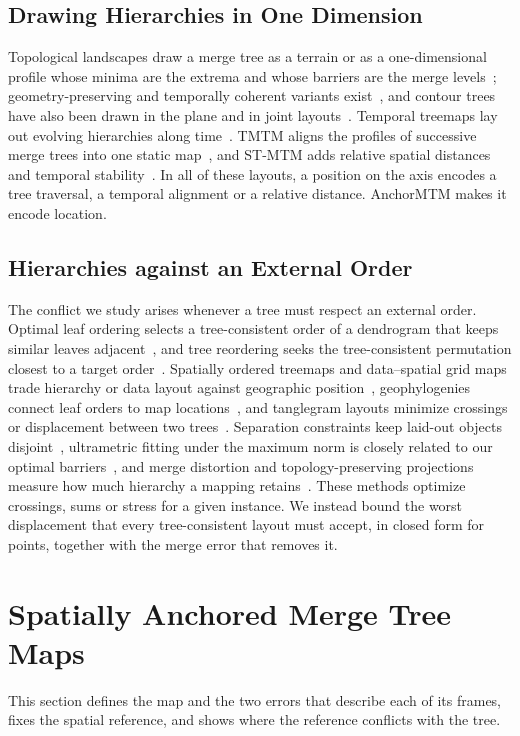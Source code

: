 \documentclass[preprint]{vgtc}   %
\begin{document}
\subsection{Drawing Hierarchies in One Dimension}
Topological landscapes draw a merge tree as a terrain or as a one-dimensional profile whose minima are the extrema and whose barriers are the merge levels~\cite{Weber:2007:TL,Oesterling:2013:TLP}; geometry-preserving and temporally coherent variants exist~\cite{Beketayev:2012:GPTL,Herick:2020:TCTL}, and contour trees have also been drawn in the plane and in joint layouts~\cite{Heine:2011:DCT,Lohfink:2020:FCT}. Temporal treemaps lay out evolving hierarchies along time~\cite{Koepp:2019:TT}. TMTM aligns the profiles of successive merge trees into one static map~\cite{Koepp:2023:TMTM}, and ST-MTM adds relative spatial distances and temporal stability~\cite{STMTM:2026}. In all of these layouts, a position on the axis encodes a tree traversal, a temporal alignment or a relative distance. AnchorMTM makes it encode location.

\subsection{Hierarchies against an External Order}
The conflict we study arises whenever a tree must respect an external order. Optimal leaf ordering selects a tree-consistent order of a dendrogram that keeps similar leaves adjacent~\cite{BarJoseph:2001:OLO,Eisen:1998:CA}, and tree reordering seeks the tree-consistent permutation closest to a target order~\cite{Bulteau:2022:RT}. Spatially ordered treemaps and data--spatial grid maps trade hierarchy or data layout against geographic position~\cite{Wood:2008:SOT,vanBeusekom:2023:DSL}, geophylogenies connect leaf orders to map locations~\cite{Klawitter:2025:GP}, and tanglegram layouts minimize crossings or displacement between two trees~\cite{Fernau:2010:CTC,Huson:2026:DOT}. Separation constraints keep laid-out objects disjoint~\cite{Dwyer:2006:IPSEP,Li:2019:SOI}, ultrametric fitting under the maximum norm is closely related to our optimal barriers~\cite{Farach:1995:RM}, and merge distortion and topology-preserving projections measure how much hierarchy a mapping retains~\cite{Eldridge:2015:MD,Doraiswamy:2021:TM}. These methods optimize crossings, sums or stress for a given instance. We instead bound the worst displacement that every tree-consistent layout must accept, in closed form for points, together with the merge error that removes it.

\section{Spatially Anchored Merge Tree Maps}\label{sec:formulation}
This section defines the map and the two errors that describe each of its frames, fixes the spatial reference, and shows where the reference conflicts with the tree.
\end{document}
